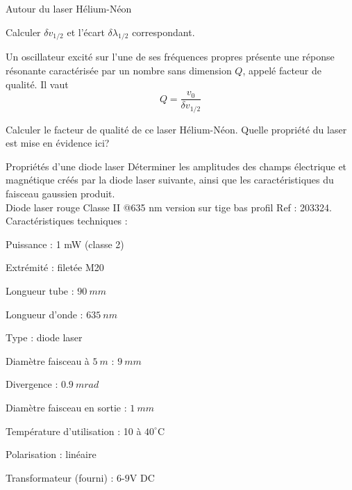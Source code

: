 \begin{exo}[PC][1][colle]{Autour du laser Hélium-Néon}
\begin{quest}
Calculer $\delta v_{1 / 2}$ et l'écart $\delta \lambda_{1 / 2}$ correspondant.
\item Un oscillateur excité sur l'une de ses fréquences propres présente une réponse résonante caractérisée par un nombre sans dimension $Q$, appelé facteur de qualité. Il vaut
$$
Q=\frac{v_0}{\delta v_{1 / 2}}
$$

Calculer le facteur de qualité de ce laser Hélium-Néon. Quelle propriété du laser est mise en évidence ici?
\end{quest}
\end{exo}

\begin{exo}[PC][1][oral]{Propriétés d'une diode laser}
  Déterminer les amplitudes des champs électrique et magnétique créés par la diode laser suivante, ainsi que les caractéristiques du faisceau gaussien produit.\\[0.3cm]

Diode laser rouge Classe II @635 nm version sur tige bas profil Ref : 203324.
Caractéristiques techniques :\\[0.3cm]
\begin{minipage}{0.49\textwidth}
  \begin{liste}
  \item Puissance : 1 mW (classe 2)
  \item Extrémité : filetée M20
  \item Longueur tube : $\SI{90}{mm}$
  \item Longueur d'onde : $\SI{635}{nm}$
  \item Type : diode laser
  \item Diamètre faisceau à $\SI{5}{m}$ : $\SI{9}{mm}$
  \end{liste}
\end{minipage}\hfill
\begin{minipage}{0.49\textwidth}
  \begin{liste}
  \item Divergence : $\SI{0.9}{mrad}$
  \item Diamètre faisceau en sortie : $\SI{1}{mm}$
  \item Température d'utilisation : 10 à $40^{\circ} \mathrm{C}$
  \item Polarisation : linéaire
  \item Transformateur (fourni) : $6$-$9$V DC
  \end{liste}
\end{minipage}
\end{exo}
